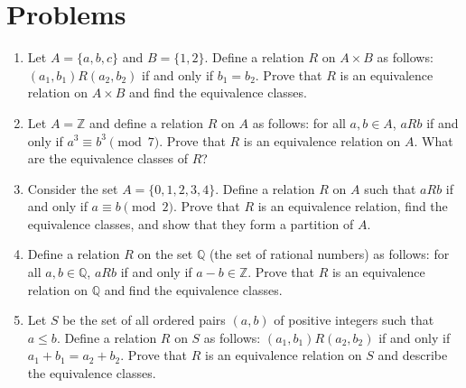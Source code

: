 \section*{Problems}

\begin{enumerate}
\item
Let $A = \{a, b, c\}$ and $B = \{1, 2\}$. Define a relation $R$ on $A \times B$ as follows: $(a_1, b_1)R(a_2, b_2)$ if and only if $b_1 = b_2$. Prove that $R$ is an equivalence relation on $A \times B$ and find the equivalence classes.

\item
Let $A = \mathbb{Z}$ and define a relation $R$ on $A$ as follows: for all $a, b \in A$, $aRb$ if and only if $a^3 \equiv b^3 \pmod{7}$. Prove that $R$ is an equivalence relation on $A$. What are the equivalence classes of $R$?

\item
Consider the set $A = \{0, 1, 2, 3, 4\}$. Define a relation $R$ on $A$ such that $aRb$ if and only if $a \equiv b \pmod{2}$. Prove that $R$ is an equivalence relation, find the equivalence classes, and show that they form a partition of $A$.

\item
Define a relation $R$ on the set $\mathbb{Q}$ (the set of rational numbers) as follows: for all $a, b \in \mathbb{Q}$, $aRb$ if and only if $a - b \in \mathbb{Z}$. Prove that $R$ is an equivalence relation on $\mathbb{Q}$ and find the equivalence classes.

\item
Let $S$ be the set of all ordered pairs $(a, b)$ of positive integers such that $a \leq b$. Define a relation $R$ on $S$ as follows: $(a_1, b_1)R(a_2, b_2)$ if and only if $a_1 + b_1 = a_2 + b_2$. Prove that $R$ is an equivalence relation on $S$ and describe the equivalence classes.
\end{enumerate}
